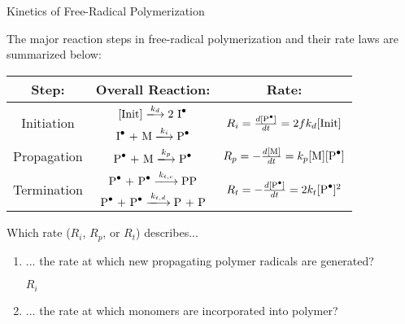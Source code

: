 \begin{activity}{Kinetics of Free-Radical Polymerization}
\begin{ctqs}
\begin{enumerate}
		\end{enumerate}

\end{ctqs}



\begin{model}
\label{\labelbase:mdl:kineticssummary}

	The major reaction steps in free-radical polymerization and their rate laws are summarized below:
	
	\begin{center}
		\renewcommand{\arraystretch}{2}
		\begin{tabular}{c c c}
			\textbf{Step:} & \textbf{Overall Reaction:} & \textbf{Rate:}\\\hline
			\multirow{2}{*}{Initiation} & $[\text{Init}] \xlongrightarrow{k_d} \text{2 \ce{I^.}}$ & \multirow{2}{*}{$ R_i = \frac{d\text{[\ce{P^.}]}}{dt} = 2fk_d[\text{Init}]$}\\
			 & $\text{\ce{I^.} + M} \xlongrightarrow{k_i} \text{\ce{P^.}}$ & \\\hline
			Propagation & $\text{\ce{P^.} + M} \xlongrightarrow{k_p} \text{\ce{P^.}}$ & $R_p = -\frac{d[\text{M}]}{dt} = k_p\text{[M][\ce{P^.}]}$\\\hline
			\multirow{2}{*}{Termination} & $\text{\ce{P^.} + \ce{P^.}} \xlongrightarrow{k_{t,c}} \text{\ce{PP}}$ & \multirow{2}{*}{$R_t = -\frac{d[\text{\ce{P^.}}]}{dt} = 2k_t [\text{\ce{P^.}}]^2$}\\
			& $\text{\ce{P^.} + \ce{P^.}} \xlongrightarrow{k_{t,d}} \text{P + P}$ & \\\hline
		\end{tabular}
	\end{center}
	\vspace{6pt}

\end{model}

\begin{ctqs}

	\question Which rate ($R_i$, $R_p$, or $R_t$) describes...
	
		\begin{enumerate}
			\item ... the rate at which new propagating polymer radicals are generated?
			
				\begin{solution}[0.4in]{}
					$R_i$
				\end{solution}
				
			\item ... the rate at which monomers are incorporated into polymer?
			

\end{enumerate}
\end{ctqs}
\end{activity}
